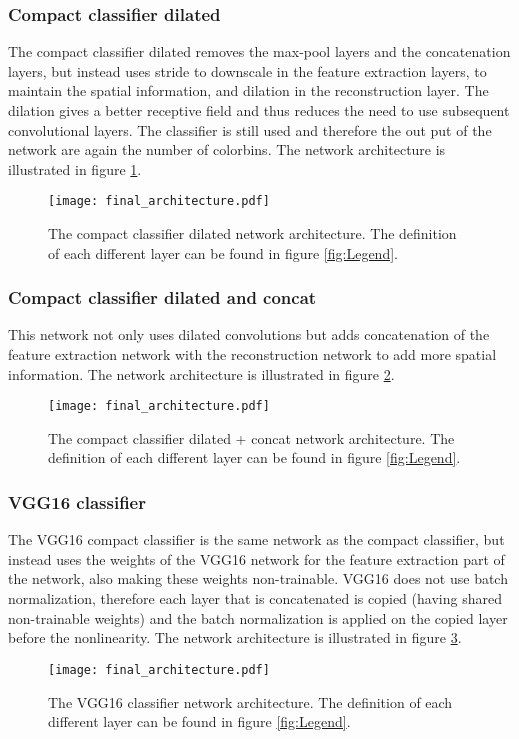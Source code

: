 \subsubsection{Compact classifier dilated}
The compact classifier dilated removes the max-pool layers and the concatenation layers, but instead uses stride to downscale in the feature extraction layers, to maintain the spatial information, and dilation in the reconstruction layer. The dilation gives a better receptive field and thus reduces the need to use subsequent convolutional layers. The classifier is still used and therefore the out put of the network are again the number of colorbins. The network architecture is illustrated in figure \ref{fig:compact_classifier_dilated}.
\begin{figure}[H]
	\centering
	\texttt{[image: final\_architecture.pdf]}
	\caption{The compact classifier dilated network architecture. The definition of each different layer can be found in figure \ref{fig:Legend}.}
	\label{fig:compact_classifier_dilated}
\end{figure}

\subsubsection{Compact classifier dilated and concat}
This network not only uses dilated convolutions but adds concatenation of the feature extraction network with the reconstruction network to add more spatial information. The network architecture is illustrated in figure \ref{fig:compact_classifier_dilated_concat}.
\begin{figure}[H]
	\centering
	\texttt{[image: final\_architecture.pdf]}
	\caption{The compact classifier dilated + concat network architecture. The definition of each different layer can be found in figure \ref{fig:Legend}.}
	\label{fig:compact_classifier_dilated_concat}
\end{figure}


\subsubsection{VGG16 classifier}
The VGG16 compact classifier is the same network as the compact classifier, but instead uses the weights of the VGG16 network for the feature extraction part of the network, also making these weights non-trainable. VGG16 does not use batch normalization, therefore each layer that is concatenated is copied (having shared non-trainable weights) and the batch normalization is applied on the copied layer before the nonlinearity. The network architecture is illustrated in figure \ref{fig:VGG_classifier}.
\begin{figure}[H]
	\centering
	\texttt{[image: final\_architecture.pdf]}
	\caption{The VGG16 classifier network architecture. The definition of each different layer can be found in figure \ref{fig:Legend}.}
	\label{fig:VGG_classifier}
\end{figure}







